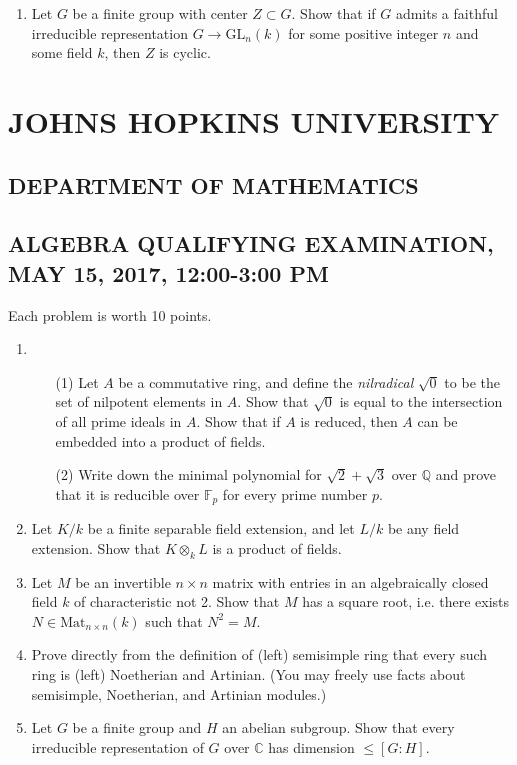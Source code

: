 \documentclass{article}
\begin{document}
\begin{enumerate}
    \item Let \(G\) be a finite group with center \(Z\subset G\). Show that if \(G\) admits a faithful irreducible representation \(G\to\text{GL}_{n}(k)\) for some positive integer \(n\) and some field \(k\), then \(Z\) is cyclic.
\end{enumerate}

\section*{JOHNS HOPKINS UNIVERSITY}
\subsection*{DEPARTMENT OF MATHEMATICS}
\subsection*{ALGEBRA QUALIFYING EXAMINATION, MAY 15, 2017, 12:00-3:00 PM}

Each problem is worth 10 points.

\begin{enumerate}
    \item 
    \begin{itemize}
        \item[(1)] Let \(A\) be a commutative ring, and define the \textit{nilradical} \(\sqrt{0}\) to be the set of nilpotent elements in \(A\). Show that \(\sqrt{0}\) is equal to the intersection of all prime ideals in \(A\). Show that if \(A\) is reduced, then \(A\) can be embedded into a product of fields.
        \item[(2)] Write down the minimal polynomial for \(\sqrt{2}+\sqrt{3}\) over \(\mathbb{Q}\) and prove that it is reducible over \(\mathbb{F}_{p}\) for every prime number \(p\).
    \end{itemize}

    \item Let \(K/k\) be a finite separable field extension, and let \(L/k\) be any field extension. Show that \(K\otimes_{k}L\) is a product of fields.

    \item Let \(M\) be an invertible \(n\times n\) matrix with entries in an algebraically closed field \(k\) of characteristic not 2. Show that \(M\) has a square root, i.e. there exists \(N\in\text{Mat}_{n\times n}(k)\) such that \(N^{2}=M\).

    \item Prove directly from the definition of (left) semisimple ring that every such ring is (left) Noetherian and Artinian. (You may freely use facts about semisimple, Noetherian, and Artinian modules.)

    \item Let \(G\) be a finite group and \(H\) an abelian subgroup. Show that every irreducible representation of \(G\) over \(\mathbb{C}\) has dimension \(\leq[G:H]\).
\end{enumerate}
\end{document}
